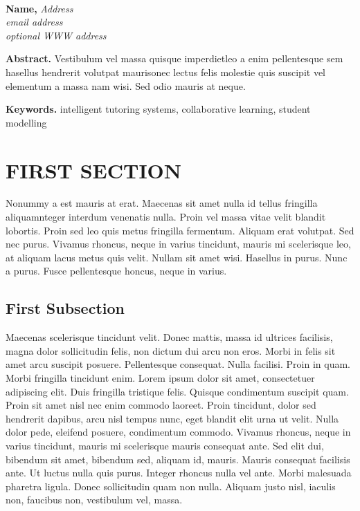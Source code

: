 \documentclass[dvips,11pt,twoside]{article}
\begin{document}
\thispagestyle{myownheadings}


\mbox{}\\
\begin{flushleft}
\end{flushleft}

\vskip 1cm \noindent\large{\bf
Name,}
{\it 
Address\\
email address\\
optional WWW address}

\vskip 22pt %
\noindent\normalsize
\begin{small}
{\bf Abstract.} Vestibulum vel massa quisque imperdietleo a enim
pellentesque sem hasellus hendrerit volutpat maurisonec lectus felis
molestie quis suscipit vel elementum a massa nam wisi.  Sed odio
mauris at neque.
\end{small}

\pagestyle{myheadings}

\vskip 22pt %
\noindent\normalsize
\begin{small}
{\bf Keywords.} intelligent tutoring systems, collaborative learning, 
student modelling
\end{small}

\vskip 22pt
\section{\large\bf FIRST SECTION}                                              

Nonummy a est mauris at erat.  Maecenas sit amet nulla id tellus
fringilla aliquamnteger interdum venenatis nulla.  Proin vel massa
vitae velit blandit lobortis.  Proin sed leo quis metus fringilla
fermentum.  Aliquam erat volutpat.  Sed nec purus.  Vivamus rhoncus,
neque in varius tincidunt, mauris mi scelerisque leo, at aliquam lacus
metus quis velit.  Nullam sit amet wisi.  Hasellus in purus.  Nunc a
purus.  Fusce pellentesque honcus, neque in varius.

\subsection{\bf First Subsection}      
Maecenas scelerisque tincidunt velit.  Donec mattis, massa id ultrices
facilisis, magna dolor sollicitudin felis, non dictum dui arcu non
eros.  Morbi in felis sit amet arcu suscipit posuere.  Pellentesque
consequat.  Nulla facilisi.  Proin in quam.  Morbi fringilla tincidunt
enim.  Lorem ipsum dolor sit amet, consectetuer adipiscing elit.  Duis
fringilla tristique felis.  Quisque condimentum suscipit quam.  Proin
sit amet nisl nec enim commodo laoreet.  Proin tincidunt, dolor sed
hendrerit dapibus, arcu nisl tempus nunc, eget blandit elit urna ut
velit.  Nulla dolor pede, eleifend posuere, condimentum commodo.
Vivamus rhoncus, neque in varius tincidunt, mauris mi scelerisque
mauris consequat ante.  Sed elit dui, bibendum sit amet, bibendum sed,
aliquam id, mauris.  Mauris consequat facilisis ante.  Ut luctus nulla
quis purus.  Integer rhoncus nulla vel ante.  Morbi malesuada pharetra
ligula.  Donec sollicitudin quam non nulla.  Aliquam justo nisl,
iaculis non, faucibus non, vestibulum vel, massa.  
\end{document}
